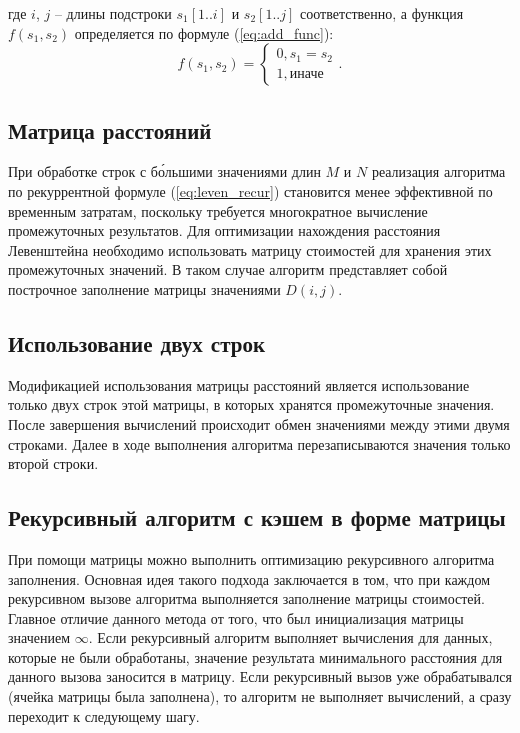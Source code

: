 где $i$, $j$ -- длины подстроки $s_{1}[1..i]$ и $s_{2}[1..j]$ соответственно, а функция $f(s_{1}, s_{2})$ определяется по формуле (\ref{eq:add_func}):
\begin{equation}
	f(s_{1}, s_{2}) =
	\begin{cases}
		0, s_{1}=s_{2}\\
		1, \text{иначе}
	\end{cases}.
	\label{eq:add_func}
\end{equation}

\subsection{Матрица расстояний}
\label{section:mtrx_dist}
При обработке строк с б\'ольшими значениями длин $M$ и $N$ реализация алгоритма по рекуррентной формуле (\ref{eq:leven_recur}) становится менее эффективной по временным затратам, поскольку требуется многократное вычисление промежуточных результатов. Для оптимизации нахождения расстояния Левенштейна необходимо использовать матрицу стоимостей для хранения этих промежуточных значений. В таком случае алгоритм представляет собой построчное заполнение матрицы значениями $D(i, j)$.

\subsection{Использование двух строк}
Модификацией использования матрицы расстояний является использование только двух строк этой матрицы, в которых хранятся промежуточные значения. После завершения вычислений происходит обмен значениями между этими двумя строками. Далее в ходе выполнения алгоритма перезаписываются значения только второй строки.

\subsection{Рекурсивный алгоритм с кэшем в форме матрицы}
При помощи матрицы можно выполнить оптимизацию рекурсивного алгоритма заполнения. Основная идея такого подхода заключается в том, что при каждом рекурсивном вызове алгоритма выполняется заполнение матрицы стоимостей. Главное отличие данного метода от того, что был  инициализация матрицы значением $\infty$. Если рекурсивный алгоритм выполняет вычисления для данных, которые не были обработаны, значение результата минимального расстояния для данного вызова заносится в матрицу. Если рекурсивный вызов уже обрабатывался (ячейка матрицы была заполнена), то алгоритм не выполняет вычислений, а сразу переходит к следующему шагу.

